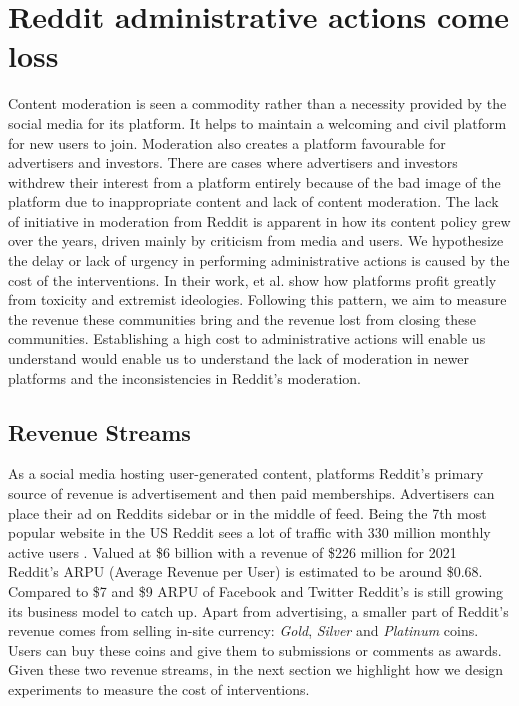 \section{Reddit administrative actions come loss}
Content moderation is seen a commodity rather than a necessity provided by the social media for its platform. It helps to maintain a welcoming and civil platform for new users to join. Moderation also creates a platform favourable for advertisers and investors. There are cases where  advertisers and investors withdrew their interest from a platform entirely because of the bad image of the platform due to inappropriate content and lack of content moderation. The lack of initiative in moderation from Reddit is apparent in how its content policy grew over the years, driven mainly by criticism from media and users. We hypothesize the delay or lack of urgency in performing administrative actions is caused by the cost of the interventions. In their work, et al. show how platforms profit greatly from toxicity and extremist ideologies. Following this pattern, we aim to measure the revenue these communities bring and the revenue lost from closing these communities. Establishing a high cost to administrative actions will enable us understand would enable us to understand the lack of moderation in newer platforms and the inconsistencies in Reddit’s moderation.

\subsection{Revenue Streams}
As a social media hosting user-generated content, platforms Reddit’s primary source of revenue is advertisement and then paid memberships. Advertisers can place their ad on Reddits sidebar or in the middle of feed. Being the 7th most popular website in the US Reddit sees a lot of traffic with 330 million monthly active users . Valued at \$6 billion with a revenue of \$226 million for 2021  Reddit’s ARPU (Average Revenue per User) is estimated to be around \$0.68. Compared to \$7 and \$9 ARPU of Facebook and Twitter Reddit’s is still growing its business model to catch up. Apart from advertising, a smaller part of Reddit’s revenue comes from selling in-site currency: \textit{Gold}, \textit{Silver} and \textit{Platinum} coins. Users can buy these coins and give them to submissions or comments as awards. Given these two revenue streams, in the next section we highlight how we design experiments to measure the cost of interventions.


